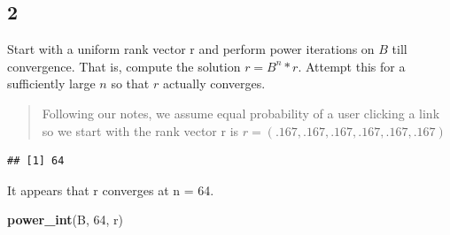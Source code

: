 \documentclass[]{article}
\newenvironment{Shaded}{\begin{snugshade}}{\end{snugshade}}
\newcommand{\KeywordTok}[1]{\textcolor[rgb]{0.13,0.29,0.53}{\textbf{{#1}}}}
\newcommand{\DecValTok}[1]{\textcolor[rgb]{0.00,0.00,0.81}{{#1}}}
\newcommand{\StringTok}[1]{\textcolor[rgb]{0.31,0.60,0.02}{{#1}}}
\newcommand{\NormalTok}[1]{{#1}}
\begin{document}
\subsection{2}\label{section-1}

Start with a uniform rank vector r and perform power iterations on \(B\)
till convergence. That is, compute the solution \(r = B^n * r\). Attempt
this for a sufficiently large \(n\) so that \(r\) actually converges.

\begin{quote}
Following our notes, we assume equal probability of a user clicking a
link so we start with the rank vector r is
\(r = (.167, .167, .167, .167, .167, .167)\)
\end{quote}

\begin{Shaded}
\end{Shaded}

\begin{verbatim}
## [1] 64
\end{verbatim}

It appears that r converges at n = 64.

\begin{Shaded}
\begin{Highlighting}[]
\KeywordTok{power_int}\NormalTok{(B, }\DecValTok{64}\NormalTok{, r)}
\end{Highlighting}
\end{Shaded}
\end{document}
